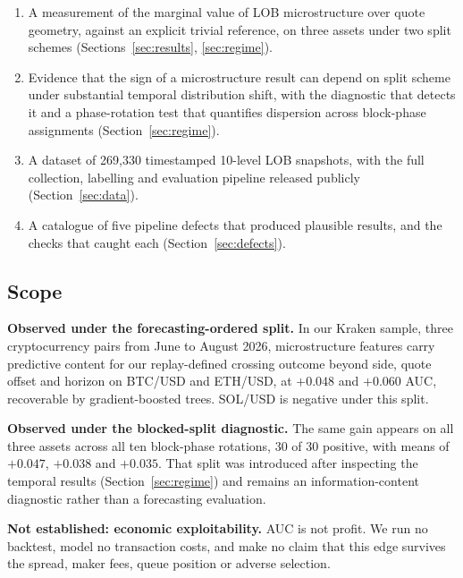 \documentclass[11pt]{article}
\begin{document}
\begin{enumerate}[itemsep=2pt,topsep=4pt]
\item A measurement of the marginal value of LOB microstructure over quote
geometry, against an explicit trivial reference, on three assets under two
split schemes (Sections~\ref{sec:results}, \ref{sec:regime}).

\item Evidence that the sign of a microstructure result can depend on split
scheme under substantial temporal distribution shift, with the diagnostic that
detects it and a phase-rotation test that quantifies dispersion across
block-phase assignments (Section~\ref{sec:regime}).

\item A dataset of 269{,}330 timestamped 10-level LOB snapshots, with the full
collection, labelling and evaluation pipeline released publicly
(Section~\ref{sec:data}).

\item A catalogue of five pipeline defects that produced plausible results,
and the checks that caught each (Section~\ref{sec:defects}).
\end{enumerate}

\subsection{Scope}
\label{sec:scope}

\textbf{Observed under the forecasting-ordered split.} In our Kraken sample,
three cryptocurrency pairs from June to August 2026, microstructure features
carry predictive content for our replay-defined crossing outcome beyond side,
quote offset and horizon on BTC/USD and ETH/USD, at $+0.048$ and $+0.060$ AUC,
recoverable by gradient-boosted trees. SOL/USD is negative under this split.

\textbf{Observed under the blocked-split diagnostic.} The same gain appears on
all three assets across all ten block-phase rotations, 30 of 30 positive, with
means of $+0.047$, $+0.038$ and $+0.035$. That split was introduced after
inspecting the temporal results (Section~\ref{sec:regime}) and remains an
information-content diagnostic rather than a forecasting evaluation.

\textbf{Not established: economic exploitability.} AUC is not profit. We run no
backtest, model no transaction costs, and make no claim that this edge survives
the spread, maker fees, queue position or adverse selection.
\end{document}
